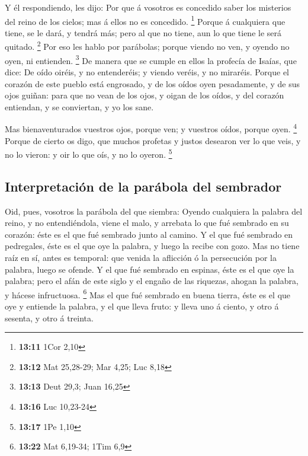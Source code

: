  Y él respondiendo, les dijo: Por que á vosotros es
concedido saber los misterios del reino de los cielos; mas á ellos no es
concedido. \footnote{\textbf{13:11} 1Cor 2,10}  Porque á
cualquiera que tiene, se le dará, y tendrá más; pero al que no tiene,
aun lo que tiene le será quitado. \footnote{\textbf{13:12} Mat 25,28-29;
  Mar 4,25; Luc 8,18}  Por eso les hablo por parábolas;
porque viendo no ven, y oyendo no oyen, ni entienden. \footnote{\textbf{13:13}
  Deut 29,3; Juan 16,25}  De manera que se cumple en
ellos la profecía de Isaías, que dice: De oído oiréis, y no entenderéis;
y viendo veréis, y no miraréis.  Porque el corazón de
este pueblo está engrosado, y de los oídos oyen pesadamente, y de sus
ojos guiñan: para que no vean de los ojos, y oigan de los oídos, y del
corazón entiendan, y se conviertan, y yo los sane.

 Mas bienaventurados vuestros ojos, porque ven; y
vuestros oídos, porque oyen. \footnote{\textbf{13:16} Luc 10,23-24}
 Porque de cierto os digo, que muchos profetas y justos
desearon ver lo que veis, y no lo vieron: y oir lo que oís, y no lo
oyeron. \footnote{\textbf{13:17} 1Pe 1,10}

\hypertarget{interpretaciuxf3n-de-la-paruxe1bola-del-sembrador}{%
\subsection{Interpretación de la parábola del
sembrador}\label{interpretaciuxf3n-de-la-paruxe1bola-del-sembrador}}

 Oid, pues, vosotros la parábola del que siembra:
 Oyendo cualquiera la palabra del reino, y no
entendiéndola, viene el malo, y arrebata lo que fué sembrado en su
corazón: éste es el que fué sembrado junto al camino.  Y
el que fué sembrado en pedregales, éste es el que oye la palabra, y
luego la recibe con gozo.  Mas no tiene raíz en sí, antes
es temporal: que venida la aflicción ó la persecución por la palabra,
luego se ofende.  Y el que fué sembrado en espinas, éste
es el que oye la palabra; pero el afán de este siglo y el engaño de las
riquezas, ahogan la palabra, y hácese infructuosa. \footnote{\textbf{13:22}
  Mat 6,19-34; 1Tim 6,9}  Mas el que fué sembrado en
buena tierra, éste es el que oye y entiende la palabra, y el que lleva
fruto: y lleva uno á ciento, y otro á sesenta, y otro á treinta.

